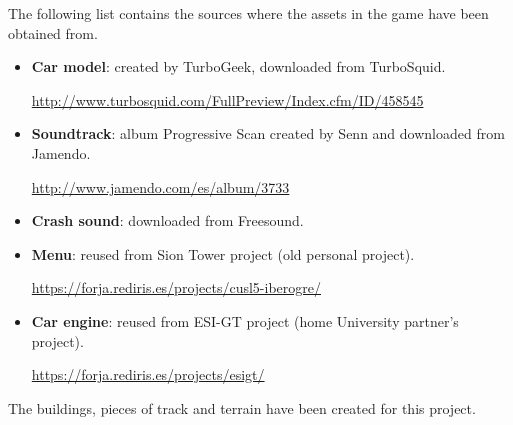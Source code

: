 
The following list contains the sources where the assets in the game have been
obtained from.

\begin{itemize}
	\item \textbf{Car model}: created by TurboGeek, downloaded from TurboSquid.
	
	\url{http://www.turbosquid.com/FullPreview/Index.cfm/ID/458545}
	
	\item \textbf{Soundtrack}: album Progressive Scan created by Senn and downloaded from
	Jamendo.
	
	\url{http://www.jamendo.com/es/album/3733}
	
	\item \textbf{Crash sound}: downloaded from Freesound.
	\item \textbf{Menu}: reused from Sion Tower project (old personal project).
	
	\url{https://forja.rediris.es/projects/cusl5-iberogre/}
	
	\item \textbf{Car engine}: reused from ESI-GT project (home University partner's project).
	
	\url{https://forja.rediris.es/projects/esigt/}
\end{itemize}

The buildings, pieces of track and terrain have been created for this project.